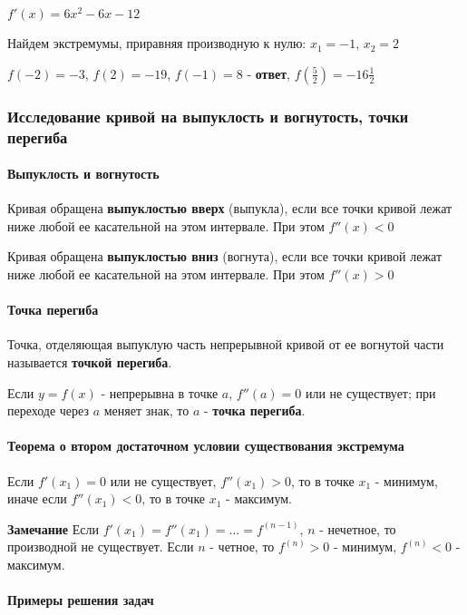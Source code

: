 \documentclass{article}
\begin{document}
\begin{flushleft}
$f'(x) = 6x^2 - 6x - 12$

Найдем экстремумы, приравняя производную к нулю: $x_1 = -1$, $x_2 = 2$

$f(-2) = -3$, $f(2) = -19$, $f(-1) = 8$ - \textbf{ответ}, $f(\frac{5}{2}) = -16 \frac{1}{2}$

\subsubsection{Исследование кривой на выпуклость и вогнутость, точки перегиба}

\paragraph{Выпуклость и вогнутость} Кривая обращена \textbf{выпуклостью вверх} (выпукла), если все точки кривой лежат ниже любой ее касательной на этом интервале. При этом $f''(x) < 0$

Кривая обращена \textbf{выпуклостью вниз} (вогнута), если все точки кривой лежат ниже любой ее касательной на этом интервале. При этом $f''(x) > 0$

\paragraph{Точка перегиба} Точка, отделяющая выпуклую часть непрерывной кривой от ее вогнутой части называется \textbf{точкой перегиба}.

Если $y = f(x)$ - непрерывна в точке $a$, $f''(a) = 0$ или не существует; при переходе через $a$ меняет знак, то $a$ - \textbf{точка перегиба}.

\paragraph{Теорема о втором достаточном условии существования экстремума}

Если $f'(x_1) = 0$ или не существует, $f''(x_1) > 0$, то в точке $x_1$ - минимум, иначе если $f''(x_1) < 0$, то в точке $x_1$ - максимум.

\textbf{Замечание} Если $f'(x_1) = f''(x_1) = ... = f^{(n - 1)}$, $n$ - нечетное, то производной не существует. Если $n$ - четное, то $f^{(n)} > 0$ - минимум, $f^{(n)} < 0$ - максимум. 

\paragraph{Примеры решения задач}


\end{flushleft}
\end{document}

